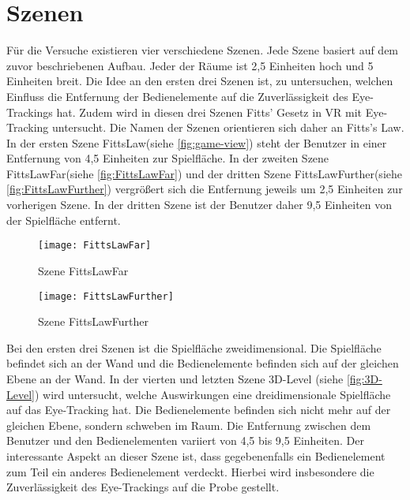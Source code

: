\section{Szenen}
Für die Versuche existieren vier verschiedene Szenen. Jede Szene basiert auf dem zuvor beschriebenen Aufbau. Jeder der Räume ist 2,5 Einheiten hoch und 5 Einheiten breit. Die Idee an den ersten drei Szenen ist, zu untersuchen, welchen Einfluss die Entfernung der Bedienelemente auf die Zuverlässigkeit des Eye-Trackings hat. Zudem wird in diesen drei Szenen Fitts' Gesetz in \ac{VR} mit Eye-Tracking untersucht. Die Namen der Szenen orientieren sich daher an Fitts's Law. In der ersten Szene \glqq FittsLaw\grqq (siehe \autoref{fig:game-view}) steht der Benutzer in einer Entfernung von 4,5 Einheiten zur Spielfläche. In der zweiten Szene \glqq FittsLawFar\grqq (siehe \autoref{fig:FittsLawFar}) und der dritten Szene \glqq FittsLawFurther\grqq (siehe \autoref{fig:FittsLawFurther}) vergrößert sich die Entfernung jeweils um 2,5 Einheiten zur vorherigen Szene. In der dritten Szene ist der Benutzer daher 9,5 Einheiten von der Spielfläche entfernt. 

\begin{figure}[!htbp]
	\centering
	\texttt{[image: FittsLawFar]}
	\caption[Szene FittsLawFar]{Szene FittsLawFar}
	\label{fig:FittsLawFar}
\end{figure}

\begin{figure}[!htbp]
	\centering
	\texttt{[image: FittsLawFurther]}
	\caption[Szene FittsLawFurther]{Szene FittsLawFurther}
	\label{fig:FittsLawFurther}
\end{figure}

Bei den ersten drei Szenen ist die Spielfläche zweidimensional. Die Spielfläche befindet sich an der Wand und die Bedienelemente befinden sich auf der gleichen Ebene an der Wand. In der vierten und letzten Szene \glqq 3D-Level\grqq{} (siehe \autoref{fig:3D-Level}) wird untersucht, welche Auswirkungen eine dreidimensionale Spielfläche auf das Eye-Tracking hat. Die Bedienelemente befinden sich nicht mehr auf der gleichen Ebene, sondern schweben im Raum. Die Entfernung zwischen dem Benutzer und den Bedienelementen variiert von 4,5 bis 9,5 Einheiten. Der interessante Aspekt an dieser Szene ist, dass gegebenenfalls ein Bedienelement zum Teil ein anderes Bedienelement verdeckt. Hierbei wird insbesondere die Zuverlässigkeit des Eye-Trackings auf die Probe gestellt. 

